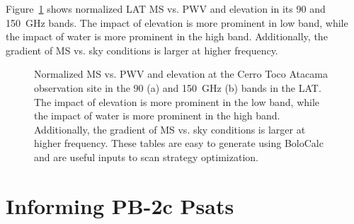 Figure~\ref{fig:so_scan_strategy} shows normalized LAT MS vs. PWV and elevation in its 90 and 150~GHz bands. The impact of elevation is more prominent in low band, while the impact of water is more prominent in the high band. Additionally, the gradient of MS vs. sky conditions is larger at higher frequency. 

\begin{figure}[!t]
  	\hfill
    \caption{Normalized MS vs. PWV and elevation at the Cerro Toco Atacama observation site in the 90 (a) and 150~GHz (b) bands in the LAT. The impact of elevation is more prominent in the low band, while the impact of water is more prominent in the high band. Additionally, the gradient of MS vs. sky conditions is larger at higher frequency. These tables are easy to generate using BoloCalc and are useful inputs to scan strategy optimization.}
    \label{fig:so_scan_strategy}
\end{figure}


\section{Informing PB-2c Psats}
\label{sec:informing_pb2c_psats}

